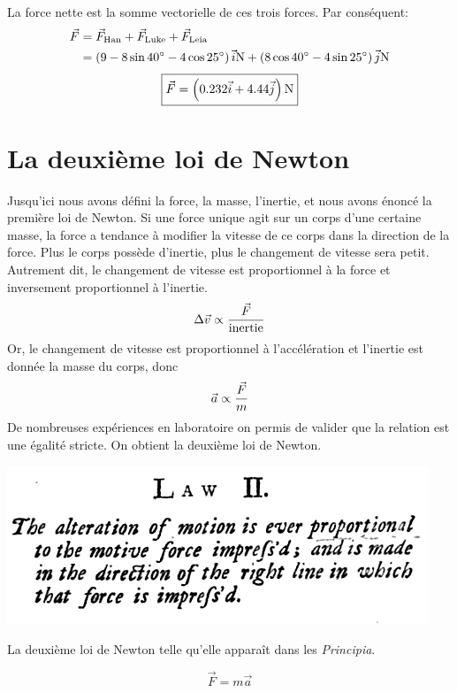 La force nette est la somme vectorielle de ces trois forces.  Par
conséquent:
\begin{align*}
  \vF &= \vF_\mathrm{Han} + \vF_\mathrm{Luke} + \vF_\mathrm{Leia}  \\
      &= \left(9 -\num{8} \sin \SI{40}{\degree} -\num{4} \cos \SI{25}{\degree} \right) \xhat \si{N}
        +\left( \num{8} \cos \SI{40}{\degree} - \num{4} \sin \SI{25}{\degree}
        \right)\yhat \si{N}
\end{align*}
\[
  \boxed{\vF = \left( \num{0.232}\xhat + \num{4.44}\yhat \right) \si{N}}
\]


\section{La deuxième loi de Newton}

Jusqu'ici nous avons défini la force, la masse, l'inertie, et nous avons énoncé
la première loi de Newton.  Si une force unique agit sur un corps d'une
certaine masse, la force a tendance à modifier la vitesse de ce corps dans la
direction de la force.  Plus le corps possède d'inertie, plus le changement de
vitesse sera petit.  Autrement dit, le changement de vitesse est proportionnel
à la force et inversement proportionnel à l'inertie.
\[
  \Delta \vv \propto \frac{\vF}{\mathrm{inertie}} 
\]
Or, le changement de vitesse est proportionnel à l'accélération et l'inertie
est donnée la masse du corps, donc
\[
  \va \propto \frac{\vF}{m}
\]
De nombreuses expériences en laboratoire on permis de valider que la relation
est une égalité stricte.  On obtient la deuxième loi de Newton.
\begin{marginfigure}
  \begin{center}
    \includegraphics[scale=0.38]{./04_Dynamique/newton2ndlaw.png}
  \end{center}
  \caption{La deuxième loi de Newton telle qu'elle apparaît dans les
    \textit{Principia}.}
  \label{fig:firstlaw}
\end{marginfigure}

\[
  \vec{F} = m\vec{a}
\]

